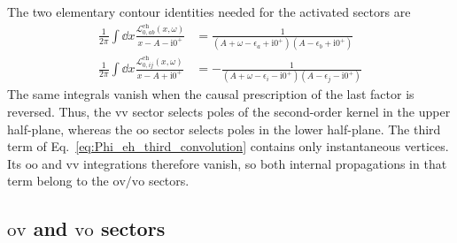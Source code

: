\documentclass[aip,jcp,reprint,noshowkeys,superscriptaddress]{revtex4-1}
\newcommand{\eps}{\epsilon}
\newcommand{\ii}{\mathrm{i}}
\newcommand{\eh}{\text{eh}}
\begin{document}
The two elementary contour identities needed for the activated sectors are
\begin{align}
    \frac{1}{2\pi}
    \int\dd{x}
    \frac{\mathcal L_{0,ab}^{\eh}(x,\omega)}{x-A-\ii0^+}
    & =
    \frac{1}
    {(A+\omega-\eps_a+\ii0^+)(A-\eps_b+\ii0^+)}
    \label{eq:vv_elementary_contour}
    \\
    \frac{1}{2\pi}
    \int\dd{x}
    \frac{\mathcal L_{0,ij}^{\eh}(x,\omega)}{x-A+\ii0^+}
    & =
    -\frac{1}
    {(A+\omega-\eps_i-\ii0^+)(A-\eps_j-\ii0^+)}
    \label{eq:oo_elementary_contour}
\end{align}
The same integrals vanish when the causal prescription of the last factor is
reversed.  Thus, the $\text{vv}$ sector selects poles of the second-order kernel
in the upper half-plane, whereas the $\text{oo}$ sector selects poles in the
lower half-plane.  The third term of
Eq.~\eqref{eq:Phi_eh_third_convolution} contains only instantaneous vertices.
Its $\text{oo}$ and $\text{vv}$ integrations therefore vanish, so both internal
propagations in that term belong to the $\text{ov}/\text{vo}$ sectors.

\subsection{$\text{ov}$ and $\text{vo}$ sectors}
\end{document}
